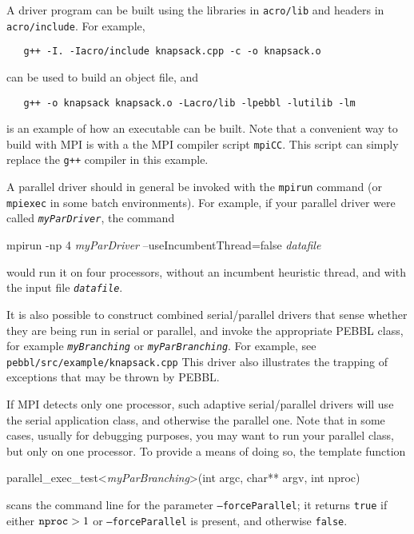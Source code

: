 A driver program can be built using the libraries in
\texttt{acro/\linebreak[0]lib} and headers in
\texttt{acro/\linebreak[0]include}.  For example,
\begin{verbatim}
   g++ -I. -Iacro/include knapsack.cpp -c -o knapsack.o
\end{verbatim}
can be used to build an object file, and 
\begin{verbatim}
   g++ -o knapsack knapsack.o -Lacro/lib -lpebbl -lutilib -lm
\end{verbatim}
is an example of how an executable can be built.  Note that a convenient
way to build with MPI is with a the MPI compiler script \texttt{mpiCC}.  This 
script can simply replace the \texttt{g++} compiler in this example.

A parallel driver should in general be invoked with the
\texttt{mpirun} command (or \texttt{mpiexec} in some batch
environments).  For example, if your parallel driver were called
\texttt{\emph{myParDriver}}, the command
\begin{codeblock}
mpirun -np 4 \emph{myParDriver} --useIncumbentThread=false \emph{datafile}
\end{codeblock}
would run it on four processors, without an incumbent heuristic
thread, and with the input file \texttt{\emph{datafile}}.

It is also possible to construct combined serial/parallel drivers that
sense whether they are being run in serial or parallel, and invoke the
appropriate PEBBL class, for example \texttt{\emph{myBranching}} or
\texttt{\emph{myParBranching}}.  For example, see
\texttt{pebbl/src/example/\linebreak[0]knapsack.cpp}
This driver also illustrates the
trapping of exceptions that may be thrown by PEBBL.

If MPI detects only one processor,
such adaptive serial/parallel 
drivers will use the serial application class, and otherwise the
parallel one.  Note that in some cases, usually for debugging
purposes, you may want to run your parallel class, but only on one
processor.  To provide a means of doing so, the template function 
\begin{codeblock}
parallel\_exec\_test<\emph{myParBranching}>(int argc, char** argv, int
nproc)
\end{codeblock}
scans the command line for the parameter \texttt{--forceParallel}; it
returns \texttt{true} if either $\text{\texttt{nproc}} > 1$ or
\texttt{--forceParallel} is present, and otherwise \texttt{false}.
